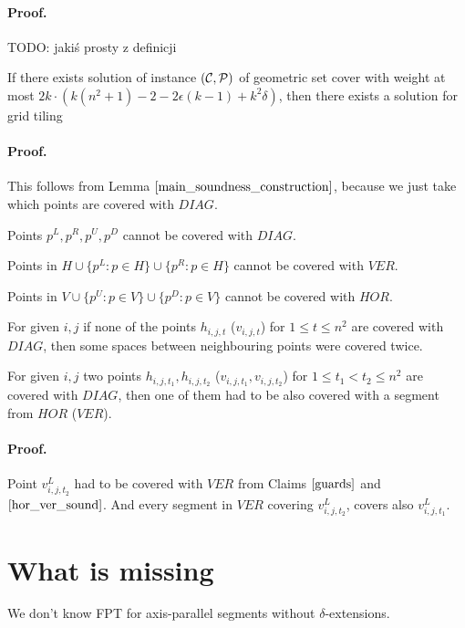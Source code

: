 \paragraph{Proof.}
TODO: jakiś prosty z definicji

\begin{lemma}
	If there exists solution  of instance $(\mathcal{C}, \mathcal{P})$
	of geometric set cover
	with weight at most $2k \cdot (k(n^2+1) - 2 - 2\epsilon(k-1)+ k^2\delta)$,
	then there exists a solution for grid tiling
\end{lemma}

\paragraph{Proof.}
This follows from Lemma $\ref{main_soundness_construction}$,
because we just take which points are covered with $DIAG$.

\begin{claim}
\label{guards}
Points $p^{L}, p^R, p^U, p^D$ cannot be covered with $DIAG$.
\end{claim}

\begin{claim}
\label{hor_ver_sound}
Points in $H \cup \{p^L : p \in H\} \cup \{p^R : p \in H\}$
cannot be covered with $VER$.

Points in $V \cup \{p^U : p \in V\} \cup \{p^D : p \in V\} $
cannot be covered with $HOR$.
\end{claim}

\begin{claim}
For given $i, j$ if none of the points $h_{i, j, t}$ ($v_{i, j, t}$)
for $1 \le t \le n^2$ are covered with $DIAG$,
then some spaces between neighbouring points were covered twice.
\end{claim}

\begin{claim}
For given $i, j$ two points $h_{i, j, t_1}, h_{i, j, t_2}$
($v_{i, j, t_1}, v_{i, j, t_2}$)
for $1 \le t_1 < t_2 \le n^2$ are covered with $DIAG$,
then one of them had to be also covered with a segment from $HOR$
($VER$).
\end{claim}
\paragraph{Proof.}
Point $v^L_{i, j, t_2}$ had to be covered with $VER$
from Claims $\ref{guards}$ and $\ref{hor_ver_sound}$.
And every segment in $VER$ covering $v^L_{i, j, t_2}$,
covers also $v^L_{i, j, t_1}$.


\section{What is missing}
We don't know FPT for axis-parallel segments without $\delta$-extensions.
